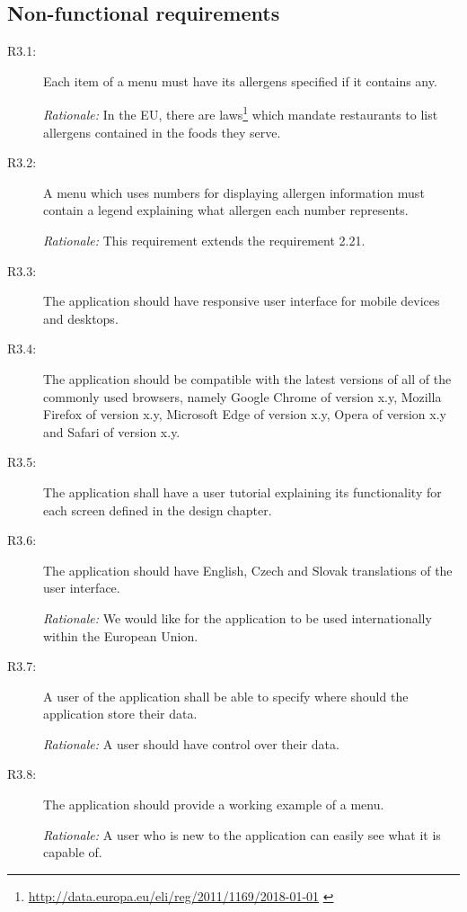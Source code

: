 \subsection{Non-functional requirements}
\begin{description}
    \item [R3.1:] Each item of a menu must have its allergens specified if it contains any.
    
    \emph{Rationale:} In the EU, there are laws\footnote{\url{http://data.europa.eu/eli/reg/2011/1169/2018-01-01}  \label{fnlabel}} which mandate restaurants to list allergens contained in the foods they serve.
    \item [R3.2:] A menu which uses numbers for displaying allergen information must contain a legend explaining what allergen each number represents.

    \emph{Rationale:} This requirement extends the requirement 2.21.
    \item [R3.3:] The application should have responsive user interface for mobile devices and desktops.
    \item [R3.4:] The application should be compatible with the latest versions of all of the commonly used browsers, namely Google Chrome of version x.y, Mozilla Firefox of version x.y, Microsoft Edge of version x.y, Opera of version x.y and Safari of version x.y.
    \item [R3.5:] The application shall have a user tutorial explaining its functionality for each screen defined in the design chapter.
    \item [R3.6:] The application should have English, Czech and Slovak translations of the user interface.

    \emph{Rationale:} We would like for the application to be used internationally within the European Union.
    \item [R3.7:] A user of the application shall be able to specify where should the application store their data.

    \emph{Rationale:} A user should have control over their data.
    \item [R3.8:] The application should provide a working example of a menu.

    \emph{Rationale:} A user who is new to the application can easily see what it is capable of.
\end{description}

\vspace*{\fill}